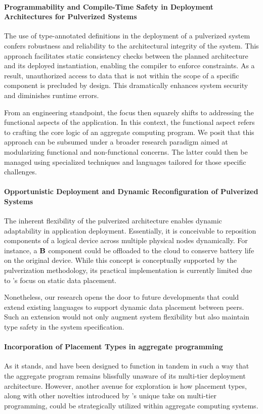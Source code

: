 \paragraph*{Programmability and Compile-Time Safety in Deployment Architectures for Pulverized Systems}
The use of type-annotated definitions in the deployment of a pulverized system confers robustness and reliability to the architectural integrity of the system. 
 This approach facilitates static consistency checks between the planned architecture and its deployed instantiation, 
 enabling the compiler to enforce constraints. 
 As a result, unauthorized access to data that is not within the scope of a specific component is precluded by design. 
 This dramatically enhances system security and diminishes runtime errors. 

From an engineering standpoint, 
 the focus then squarely shifts to addressing the functional aspects of the application. 
 In this context, the functional aspect refers to crafting the core logic of an aggregate computing program. 
 We posit that this approach can be subsumed under a broader research paradigm aimed at modularizing functional and non-functional concerns. 
 The latter could then be managed using specialized techniques and languages tailored for those specific challenges.

\paragraph*{Opportunistic Deployment and Dynamic Reconfiguration of Pulverized Systems}
The inherent flexibility of the pulverized architecture enables dynamic adaptability in application deployment. 
 Essentially, it is conceivable to reposition components of a logical device across multiple physical nodes dynamically. 
 For instance, a $\mathbf{B}$ component could be offloaded to the cloud to conserve battery life on the original device. 
 While this concept is conceptually supported by the pulverization methodology, its practical implementation is currently limited due to \scalaloci{}'s focus on static data placement.

Nonetheless, 
 our research opens the door to future developments that could extend existing languages to support dynamic data placement between peers. 
 Such an extension would not only augment system flexibility but also maintain type safety in the system specification.

\paragraph*{Incorporation of Placement Types in aggregate programming}
As it stands, \scalaloci{} and \scafi{} have been designed to function in tandem in such a way that the aggregate program remains blissfully unaware of its multi-tier deployment architecture. However, another avenue for exploration is how placement types, along with other novelties introduced by \scalaloci{}'s unique take on multi-tier programming, could be strategically utilized within aggregate computing systems.

